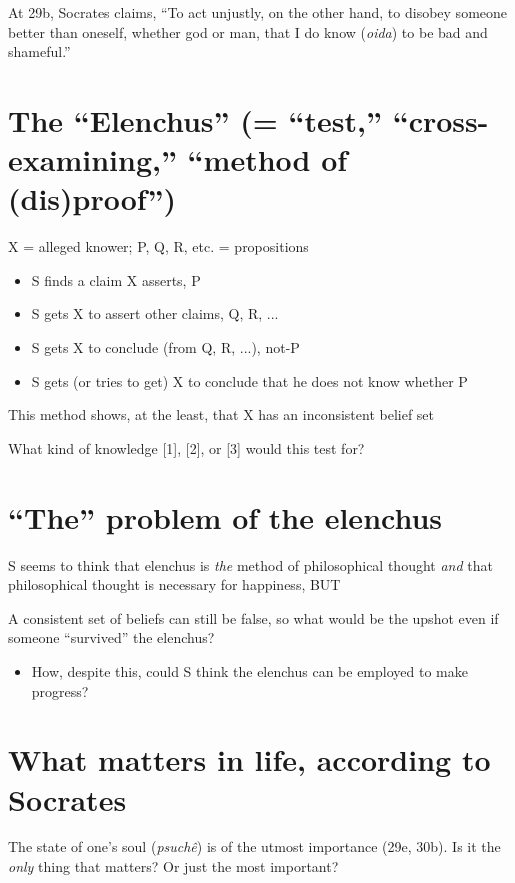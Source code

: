 \documentclass[11pt]{article}
\begin{document}
\noindent At 29b, Socrates claims, ``To act unjustly, on the other hand, to disobey someone better than oneself, whether god or man, that I do know (\emph{oida}) to be bad and shameful.''
\vspace*{-4mm}
\section*{The ``Elenchus'' (= ``test,'' ``cross-examining,'' ``method of (dis)proof'')}
\noindent X = alleged knower; P, Q, R, etc. = propositions
\begin{itemize}
\item{S finds a claim X asserts, P}\item{S gets X to assert other claims, Q, R, ...}\item{S gets X to conclude (from Q, R, ...), not-P}\item{S gets (or tries to get) X to conclude that he does not know whether P}\end{itemize}
\noindent This method shows, at the least, that X has an inconsistent belief set
\vspace*{2mm}

\noindent What kind of knowledge [1], [2], or [3] would this test for?
\vspace*{-3mm}
\section*{``The'' problem of the elenchus}
\noindent S seems to think that elenchus is \emph{the} method of philosophical thought \emph{and} that philosophical thought is necessary for happiness, BUT
\vspace*{2mm}

\noindent A consistent set of beliefs can still be false, so what would be the upshot even if someone ``survived'' the elenchus?

\begin{itemize}\item{How, despite this, could S think the elenchus can be employed to make progress?}
\end{itemize}
\vspace*{-3mm}
\section*{What matters in life, according to Socrates}

\noindent The state of one's soul (\emph{psuch\^{e}}) is of the utmost importance (29e, 30b). Is it the \emph{only} thing that matters? Or just the most important?
\vspace*{2mm}
\end{document}
